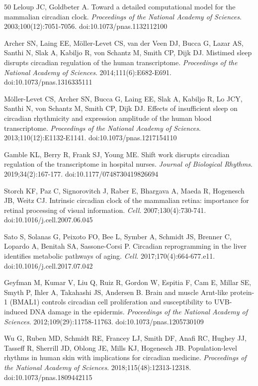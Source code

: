 \documentclass[11pt,a4paper]{article}
\begin{document}
\begin{thebibliography}{50}
Leloup JC, Goldbeter A.
Toward a detailed computational model for the mammalian circadian clock.
\textit{Proceedings of the National Academy of Sciences}. 2003;100(12):7051-7056. doi:10.1073/pnas.1132112100

Archer SN, Laing EE, M{\"o}ller-Levet CS, van der Veen DJ, Bucca G, Lazar AS, Santhi N, Slak A, Kabiljo R, von Schantz M, Smith CP, Dijk DJ.
Mistimed sleep disrupts circadian regulation of the human transcriptome.
\textit{Proceedings of the National Academy of Sciences}. 2014;111(6):E682-E691. doi:10.1073/pnas.1316335111

M{\"o}ller-Levet CS, Archer SN, Bucca G, Laing EE, Slak A, Kabiljo R, Lo JCY, Santhi N, von Schantz M, Smith CP, Dijk DJ.
Effects of insufficient sleep on circadian rhythmicity and expression amplitude of the human blood transcriptome.
\textit{Proceedings of the National Academy of Sciences}. 2013;110(12):E1132-E1141. doi:10.1073/pnas.1217154110

Gamble KL, Berry R, Frank SJ, Young ME.
Shift work disrupts circadian regulation of the transcriptome in hospital nurses.
\textit{Journal of Biological Rhythms}. 2019;34(2):167-177. doi:10.1177/0748730419826694

Storch KF, Paz C, Signorovitch J, Raber E, Bhargava A, Maeda R, Hogenesch JB, Weitz CJ.
Intrinsic circadian clock of the mammalian retina: importance for retinal processing of visual information.
\textit{Cell}. 2007;130(4):730-741. doi:10.1016/j.cell.2007.06.045

Sato S, Solanas G, Peixoto FO, Bee L, Symber A, Schmidt JS, Brenner C, Lopardo A, Benitah SA, Sassone-Corsi P.
Circadian reprogramming in the liver identifies metabolic pathways of aging.
\textit{Cell}. 2017;170(4):664-677.e11. doi:10.1016/j.cell.2017.07.042

Geyfman M, Kumar V, Liu Q, Ruiz R, Gordon W, Espitia F, Cam E, Millar SE, Smyth P, Ihler A, Takahashi JS, Andersen B.
Brain and muscle Arnt-like protein-1 (BMAL1) controls circadian cell proliferation and susceptibility to UVB-induced DNA damage in the epidermis.
\textit{Proceedings of the National Academy of Sciences}. 2012;109(29):11758-11763. doi:10.1073/pnas.1205730109

Wu G, Ruben MD, Schmidt RE, Francey LJ, Smith DF, Anafi RC, Hughey JJ, Tasseff R, Sherrill JD, Oblong JE, Mills KJ, Hogenesch JB.
Population-level rhythms in human skin with implications for circadian medicine.
\textit{Proceedings of the National Academy of Sciences}. 2018;115(48):12313-12318. doi:10.1073/pnas.1809442115


\end{thebibliography}
\end{document}
